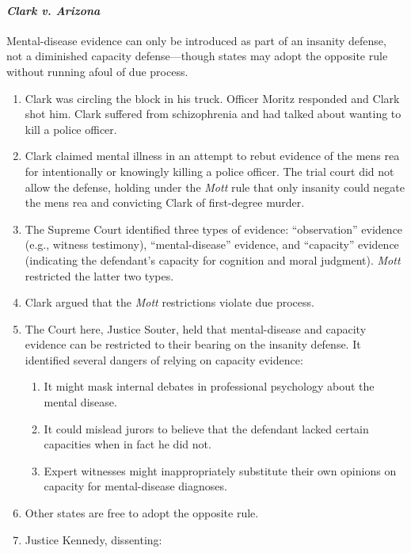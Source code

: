 \paragraph{\emph{Clark v. Arizona}}

Mental-disease evidence can only be introduced as part of an insanity defense, 
not a diminished capacity defense---though states may adopt the opposite rule 
without running afoul of due process.

\begin{enumerate}
    \item Clark was circling the block in his truck. Officer Moritz responded 
    and Clark shot him. Clark suffered from schizophrenia and had talked about 
    wanting to kill a police officer.
    \item Clark claimed mental illness in an attempt to rebut evidence of the 
    mens rea for intentionally or knowingly killing a police officer. The 
    trial court did not allow the defense, holding under the \emph{Mott} rule 
    that only insanity could negate the mens rea and convicting Clark of 
    first-degree murder.
    \item The Supreme Court identified three types of evidence: 
    ``observation'' evidence (e.g., witness testimony), ``mental-disease'' 
    evidence, and ``capacity'' evidence (indicating the defendant's capacity 
    for cognition and moral judgment). \emph{Mott} restricted the latter two 
    types.
    \item Clark argued that the \emph{Mott} restrictions violate due process.
    \item The Court here, Justice Souter, held that mental-disease and 
    capacity evidence can be restricted to their bearing on the insanity 
    defense. It identified several dangers of relying on capacity evidence:
    \begin{enumerate}
        \item It might mask internal debates in professional psychology about 
        the mental disease.
        \item It could mislead jurors to believe that the defendant lacked 
        certain capacities when in fact he did not.
        \item Expert witnesses might inappropriately substitute their own 
        opinions on capacity for mental-disease diagnoses.
    \end{enumerate}
    \item Other states are free to adopt the opposite rule.
    \item Justice Kennedy, dissenting:

\end{enumerate}

